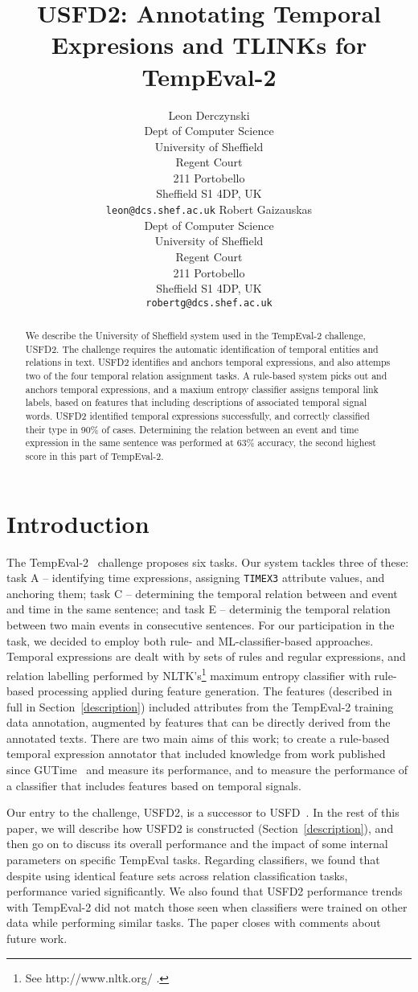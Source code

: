 \documentclass[11pt]{article}
\title{USFD2: Annotating Temporal Expresions and TLINKs for TempEval-2}
\author{Leon Derczynski\\
  Dept of Computer Science\\ 
  University of Sheffield\\ 
  Regent Court\\
  211 Portobello\\ 
  Sheffield S1 4DP, UK\\ 
  {\tt leon@dcs.shef.ac.uk} \And
  Robert Gaizauskas\\
  Dept of Computer Science\\
  University of Sheffield\\
  Regent Court\\
  211 Portobello\\
  Sheffield S1 4DP, UK\\
  {\tt robertg@dcs.shef.ac.uk}
}
\date{}
\begin{document}
\maketitle
\begin{abstract}
We describe the University of Sheffield system used in the TempEval-2 challenge, USFD2. The challenge requires the automatic identification of temporal entities and relations in text. USFD2 identifies and anchors temporal expressions, and also attemps two of the four temporal relation assignment tasks. A rule-based system picks out and anchors temporal expressions, and a maxium entropy classifier assigns temporal link labels, based on features that including descriptions of associated temporal signal words. USFD2 identified temporal expressions successfully, and correctly classified their type in 90\% of cases. Determining the relation between an event and time expression in the same sentence was performed at 63\% accuracy, the second highest score in this part of TempEval-2.
\end{abstract}

\section{Introduction}
The TempEval-2~\cite{pustejovsky2009semeval} challenge proposes six tasks. Our system tackles three of these: task A -- identifying time expressions, assigning {\tt TIMEX3} attribute values, and anchoring them; task C -- determining the temporal relation between and event and time in the same sentence; and task E -- determinig the temporal relation between two main events in consecutive sentences. For our participation in the task, we decided to employ both rule- and ML-classifier-based approaches. Temporal expressions are dealt with by sets of rules and regular expressions, and relation labelling performed by NLTK's\footnote{See http://www.nltk.org/ .} maximum entropy classifier with rule-based processing applied during feature generation. The features (described in full in Section~\ref{description}) included attributes from the TempEval-2 training data annotation, augmented by features that can be directly derived from the annotated texts. There are two main aims of this work; to create a rule-based temporal expression annotator that included knowledge from work published since GUTime~\cite{mani2000robust} and measure its performance, and to measure the performance of a classifier that includes features based on temporal signals.

Our entry to the challenge, USFD2, is a successor to USFD~\cite{hepple2007usfd}. In the rest of this paper, we will describe how USFD2 is constructed (Section~\ref{description}), and then go on to discuss its overall performance and the impact of some internal parameters on specific TempEval tasks. Regarding classifiers, we found that despite using identical feature sets across relation classification tasks, performance varied significantly. We also found that USFD2 performance trends with TempEval-2 did not match those seen when classifiers were trained on other data while performing similar tasks. The paper closes with comments about future work.
\end{document}
